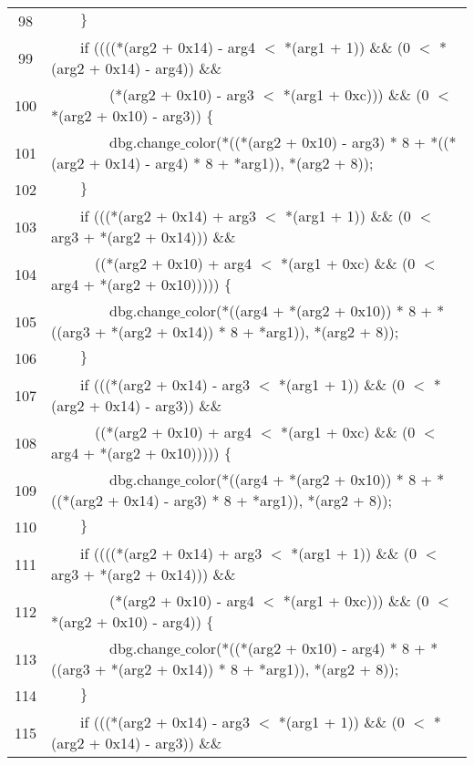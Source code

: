 \documentclass{report}
\newcommand{\tab}{$\quad$}
\newcommand{\csfont}[1]{\fontfamily{cmtt}\selectfont #1}
\begin{document}
\begin{tabular}{c|l}
  98 & {\csfont{\tab \tab $\}$}} \\
  99 & {\csfont{\tab \tab if ((((*(arg2 + 0x14) - arg4 $<$ *(arg1 + 1)) $\&$$\&$ (0 $<$ *(arg2 + 0x14) - arg4)) $\&$$\&$}} \\
  100 & {\csfont{\tab \tab \tab \tab (*(arg2 + 0x10) - arg3 $<$ *(arg1 + 0xc))) $\&$$\&$ (0 $<$ *(arg2 + 0x10) - arg3)) $\{$}} \\
  101 & {\csfont{\tab \tab \tab \tab dbg.change$\_$color(*((*(arg2 + 0x10) - arg3) * 8 + *((*(arg2 + 0x14) - arg4) * 8 + *arg1)), *(arg2 + 8));}} \\
  102 & {\csfont{\tab \tab $\}$}} \\
  103 & {\csfont{\tab \tab if (((*(arg2 + 0x14) + arg3 $<$ *(arg1 + 1)) $\&$$\&$ (0 $<$ arg3 + *(arg2 + 0x14))) $\&$$\&$}} \\
  104 & {\csfont{\tab \tab \tab  ((*(arg2 + 0x10) + arg4 $<$ *(arg1 + 0xc) $\&$$\&$ (0 $<$ arg4 + *(arg2 + 0x10))))) $\{$}} \\
  105 & {\csfont{\tab \tab \tab \tab dbg.change$\_$color(*((arg4 + *(arg2 + 0x10)) * 8 + *((arg3 + *(arg2 + 0x14)) * 8 + *arg1)), *(arg2 + 8));}} \\
  106 & {\csfont{\tab \tab $\}$}} \\
  107 & {\csfont{\tab \tab if (((*(arg2 + 0x14) - arg3 $<$ *(arg1 + 1)) $\&$$\&$ (0 $<$ *(arg2 + 0x14) - arg3)) $\&$$\&$}} \\
  108 & {\csfont{\tab \tab \tab  ((*(arg2 + 0x10) + arg4 $<$ *(arg1 + 0xc) $\&$$\&$ (0 $<$ arg4 + *(arg2 + 0x10))))) $\{$}} \\
  109 & {\csfont{\tab \tab \tab \tab dbg.change$\_$color(*((arg4 + *(arg2 + 0x10)) * 8 + *((*(arg2 + 0x14) - arg3) * 8 + *arg1)), *(arg2 + 8));}} \\
  110 & {\csfont{\tab \tab $\}$}} \\
  111 & {\csfont{\tab \tab if ((((*(arg2 + 0x14) + arg3 $<$ *(arg1 + 1)) $\&$$\&$ (0 $<$ arg3 + *(arg2 + 0x14))) $\&$$\&$}} \\
  112 & {\csfont{\tab \tab \tab \tab (*(arg2 + 0x10) - arg4 $<$ *(arg1 + 0xc))) $\&$$\&$ (0 $<$ *(arg2 + 0x10) - arg4)) $\{$}} \\
  113 & {\csfont{\tab \tab \tab \tab dbg.change$\_$color(*((*(arg2 + 0x10) - arg4) * 8 + *((arg3 + *(arg2 + 0x14)) * 8 + *arg1)), *(arg2 + 8));}} \\
  114 & {\csfont{\tab \tab $\}$}} \\
  115 & {\csfont{\tab \tab if (((*(arg2 + 0x14) - arg3 $<$ *(arg1 + 1)) $\&$$\&$ (0 $<$ *(arg2 + 0x14) - arg3)) $\&$$\&$}} \\

\end{tabular}
\end{document}

